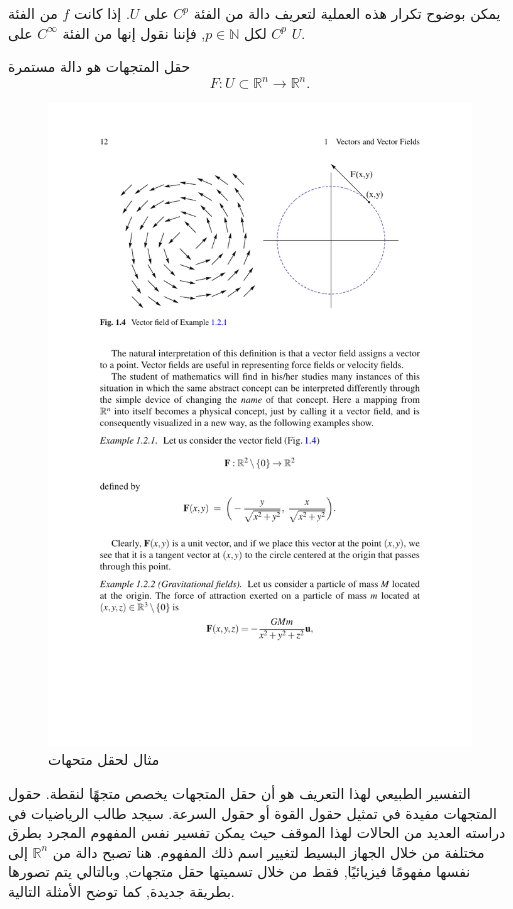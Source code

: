 يمكن بوضوح تكرار هذه العملية لتعريف دالة من الفئة \( C^p \) على \( U \). إذا كانت \( f \) من الفئة \( C^p \) لكل \( p \in \mathbb{N} \), فإننا نقول إنها من الفئة \( C^\infty \) على \( U \).

\begin{definition}
حقل المتجهات هو دالة مستمرة
\[ F : U \subset \mathbb{R}^n \to \mathbb{R}^n. \]
\end{definition}

\begin{figure}
    \centering
    \includegraphics[width=0.8\linewidth]{vector field.pdf}
    \caption{مثال لحقل متحهات}
    \label{fig:enter-label}
\end{figure}

التفسير الطبيعي لهذا التعريف هو أن حقل المتجهات يخصص متجهًا لنقطة. حقول المتجهات مفيدة في تمثيل حقول القوة أو حقول السرعة. سيجد طالب الرياضيات في دراسته العديد من الحالات لهذا الموقف حيث يمكن تفسير نفس المفهوم المجرد بطرق مختلفة من خلال الجهاز البسيط لتغيير اسم ذلك المفهوم. هنا تصبح دالة من \( \mathbb{R}^n \) إلى نفسها مفهومًا فيزيائيًا, فقط من خلال تسميتها حقل متجهات, وبالتالي يتم تصورها بطريقة جديدة, كما توضح الأمثلة التالية.

